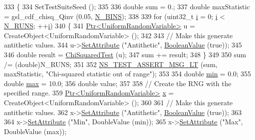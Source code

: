 \begin{DoxyCode}
333 \{
334   SetTestSuiteSeed ();
335 
336   \textcolor{keywordtype}{double} sum = 0.;
337   \textcolor{keywordtype}{double} maxStatistic = gsl\_cdf\_chisq\_Qinv (0.05, \hyperlink{classRandomVariableStreamUniformAntitheticTestCase_a5190e19d3366cfdbdcf9dd3d67fcb667}{N\_BINS});
338 
339   \textcolor{keywordflow}{for} (uint32\_t \hyperlink{bernuolliDistribution_8m_a6f6ccfcf58b31cb6412107d9d5281426}{i} = 0; \hyperlink{bernuolliDistribution_8m_a6f6ccfcf58b31cb6412107d9d5281426}{i} < \hyperlink{classRandomVariableStreamUniformAntitheticTestCase_a536a5cfa5a8c115b90bd28725552da65}{N\_RUNS}; ++\hyperlink{bernuolliDistribution_8m_a6f6ccfcf58b31cb6412107d9d5281426}{i})
340     \{
341       \hyperlink{classns3_1_1Ptr}{Ptr<UniformRandomVariable>} u = CreateObject<UniformRandomVariable> ();
342 
343       \textcolor{comment}{// Make this generate antithetic values.}
344       u->\hyperlink{classns3_1_1ObjectBase_ac60245d3ea4123bbc9b1d391f1f6592f}{SetAttribute} (\textcolor{stringliteral}{"Antithetic"}, \hyperlink{classns3_1_1BooleanValue}{BooleanValue} (\textcolor{keyword}{true}));
345 
346       \textcolor{keywordtype}{double} result = \hyperlink{classRandomVariableStreamUniformAntitheticTestCase_af58e40a706e13445a6adfbdb4873ad45}{ChiSquaredTest} (u);
347       sum += result;
348     \}
349 
350   sum /= (double)N\_RUNS;
351 
352   \hyperlink{group__testing_ga1d96848b91407c9a0b36583e8b0ad7ae}{NS\_TEST\_ASSERT\_MSG\_LT} (sum, maxStatistic, \textcolor{stringliteral}{"Chi-squared statistic out of range"});
353 
354   \textcolor{keywordtype}{double} \hyperlink{80211b_8c_ac6afabdc09a49a433ee19d8a9486056d}{min} = 0.0;
355   \textcolor{keywordtype}{double} \hyperlink{80211b_8c_affe776513b24d84b39af8ab0930fef7f}{max} = 10.0;
356   \textcolor{keywordtype}{double} value;
357 
358   \textcolor{comment}{// Create the RNG with the specified range.}
359   \hyperlink{classns3_1_1Ptr}{Ptr<UniformRandomVariable>} \hyperlink{lte__link__budget__x2__handover__measures_8m_a9336ebf25087d91c818ee6e9ec29f8c1}{x} = CreateObject<UniformRandomVariable> ();
360 
361   \textcolor{comment}{// Make this generate antithetic values.}
362   x->\hyperlink{classns3_1_1ObjectBase_ac60245d3ea4123bbc9b1d391f1f6592f}{SetAttribute} (\textcolor{stringliteral}{"Antithetic"}, \hyperlink{classns3_1_1BooleanValue}{BooleanValue} (\textcolor{keyword}{true}));
363 
364   x->\hyperlink{classns3_1_1ObjectBase_ac60245d3ea4123bbc9b1d391f1f6592f}{SetAttribute} (\textcolor{stringliteral}{"Min"}, DoubleValue (min));
365   x->\hyperlink{classns3_1_1ObjectBase_ac60245d3ea4123bbc9b1d391f1f6592f}{SetAttribute} (\textcolor{stringliteral}{"Max"}, DoubleValue (max));

\end{DoxyCode}
